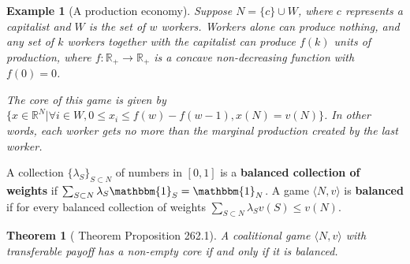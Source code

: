 \documentclass[openany]{book}
\newtheorem{theorem}{Theorem}[chapter]
\newtheorem{example}{Example}[chapter]
\theoremstyle{remark}
\begin{document}
\begin{example}[A production economy]
    Suppose $N=\{c\}\cup W$, where $c$ represents a capitalist and $W$ is the set of $w$ workers. Workers alone can produce nothing, and any set of $k$ workers together with the capitalist can produce $f(k)$ units of production, where $f:\mathbb{R}_+\to \mathbb{R}_+$ is a concave non-decreasing function with $f(0)=0$.

    The core of this game is given by $\{x\in \mathbb{R}^N|\forall i\in W,0\le x_i\le f(w)-f(w-1),x(N)=v(N)\}$. In other words, each worker gets no more than the marginal production created by the last worker.
\end{example}

A collection $\{\lambda_S\}_{S\subset N}$ of numbers in $[0,1]$ is a \textbf{balanced collection of weights} if $\sum_{S\subset N}^{}\lambda_S\mathbbm{1}_S=\mathbbm{1}_N$. A game $\langle N,v\rangle$ is \textbf{balanced} if for every balanced collection of weights $\sum_{S\subset N}^{}\lambda_Sv(S)\le v(N)$.
\begin{theorem}[\cite{OR94} Theorem Proposition 262.1]
    A coalitional game $\langle N,v\rangle$ with transferable payoff has a non-empty core if and only if it is balanced.
\end{theorem}
\end{document}

